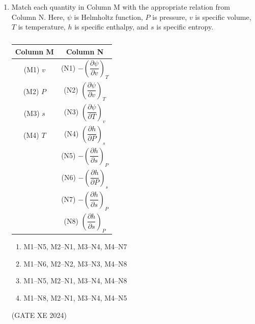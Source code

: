 \documentclass[12pt]{article}
\begin{document}
\begin{enumerate}
\begin{enumerate}
    \item always zero
    \item infinite
    \item finite, positive, and non-zero
    \item finite, negative, and non-zero
\end{enumerate}

(GATE XE 2024)

\item Match each quantity in Column M with the appropriate relation from Column N. 
Here, $\psi$ is Helmholtz function, $P$ is pressure, $v$ is specific volume, $T$ is temperature, 
$h$ is specific enthalpy, and $s$ is specific entropy.

\begin{table}[H]
\centering
\caption{}
\label{}
\begin{tabular}{|c|c|}
\hline
\textbf{Column M} & \textbf{Column N} \\ \hline
(M1) $v$ & (N1) $-\left(\dfrac{\partial \psi}{\partial v}\right)_{T}$ \\ \hline
(M2) $P$ & (N2) $\left(\dfrac{\partial \psi}{\partial v}\right)_{T}$ \\ \hline
(M3) $s$ & (N3) $\left(\dfrac{\partial \psi}{\partial T}\right)_{v}$ \\ \hline
(M4) $T$ & (N4) $\left(\dfrac{\partial h}{\partial P}\right)_{s}$ \\ \hline
& (N5) $-\left(\dfrac{\partial h}{\partial s}\right)_{P}$ \\ \hline
& (N6) $-\left(\dfrac{\partial h}{\partial P}\right)_{s}$ \\ \hline
& (N7) $-\left(\dfrac{\partial h}{\partial s}\right)_{P}$ \\ \hline
& (N8) $\left(\dfrac{\partial h}{\partial s}\right)_{P}$ \\ \hline
\end{tabular}
\end{table}

\begin{enumerate}
    \item M1–N5, M2–N1, M3–N4, M4–N7
    \item M1–N6, M2–N2, M3–N3, M4–N8
    \item M1–N5, M2–N1, M3–N4, M4–N8
    \item M1–N8, M2–N1, M3–N4, M4–N5
\end{enumerate}

(GATE XE 2024)


\end{enumerate}
\end{document}
